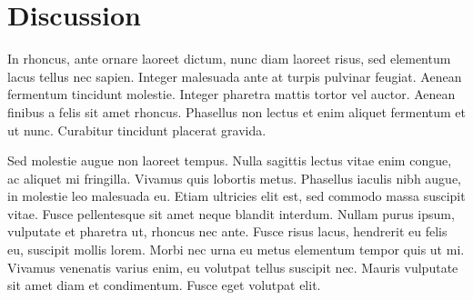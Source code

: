 \section{Discussion}

In rhoncus, ante ornare laoreet dictum, nunc diam laoreet risus, sed elementum lacus tellus nec sapien. Integer malesuada ante at turpis pulvinar feugiat. Aenean fermentum tincidunt molestie. Integer pharetra mattis tortor vel auctor. Aenean finibus a felis sit amet rhoncus. Phasellus non lectus et enim aliquet fermentum et ut nunc. Curabitur tincidunt placerat gravida.

Sed molestie augue non laoreet tempus. Nulla sagittis lectus vitae enim congue, ac aliquet mi fringilla. Vivamus quis lobortis metus. Phasellus iaculis nibh augue, in molestie leo malesuada eu. Etiam ultricies elit est, sed commodo massa suscipit vitae. Fusce pellentesque sit amet neque blandit interdum. Nullam purus ipsum, vulputate et pharetra ut, rhoncus nec ante. Fusce risus lacus, hendrerit eu felis eu, suscipit mollis lorem. Morbi nec urna eu metus elementum tempor quis ut mi. Vivamus venenatis varius enim, eu volutpat tellus suscipit nec. Mauris vulputate sit amet diam et condimentum. Fusce eget volutpat elit.